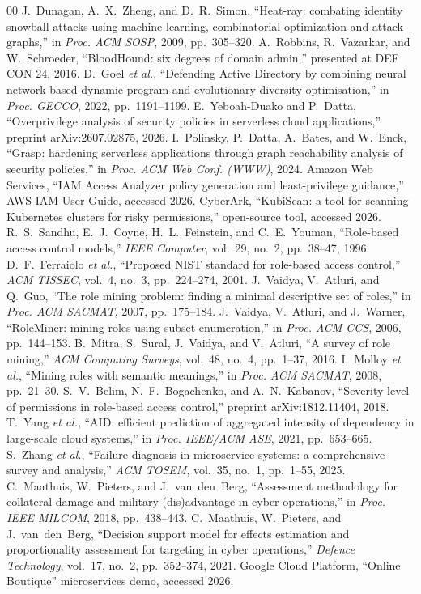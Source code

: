 \documentclass[conference]{IEEEtran}
\begin{document}
\begin{thebibliography}{00}
 J.~Dunagan, A.~X.~Zheng, and D.~R.~Simon, ``Heat-ray: combating
identity snowball attacks using machine learning, combinatorial optimization and
attack graphs,'' in \emph{Proc. ACM SOSP}, 2009, pp.~305--320.
 A.~Robbins, R.~Vazarkar, and W.~Schroeder, ``BloodHound: six
degrees of domain admin,'' presented at DEF CON 24, 2016.
 D.~Goel \emph{et al.}, ``Defending Active Directory by combining
neural network based dynamic program and evolutionary diversity optimisation,'' in
\emph{Proc. GECCO}, 2022, pp.~1191--1199.
 E.~Yeboah-Duako and P.~Datta, ``Overprivilege analysis of
security policies in serverless cloud applications,'' preprint arXiv:2607.02875,
2026.
 I.~Polinsky, P.~Datta, A.~Bates, and W.~Enck, ``Grasp: hardening
serverless applications through graph reachability analysis of security policies,''
in \emph{Proc. ACM Web Conf. (WWW)}, 2024.
 Amazon Web Services, ``IAM Access Analyzer policy generation and
least-privilege guidance,'' AWS IAM User Guide, accessed 2026.
 CyberArk, ``KubiScan: a tool for scanning Kubernetes clusters for
risky permissions,'' open-source tool, accessed 2026.
 R.~S.~Sandhu, E.~J.~Coyne, H.~L.~Feinstein, and C.~E.~Youman,
``Role-based access control models,'' \emph{IEEE Computer}, vol.~29, no.~2,
pp.~38--47, 1996.
 D.~F.~Ferraiolo \emph{et al.}, ``Proposed NIST standard for
role-based access control,'' \emph{ACM TISSEC}, vol.~4, no.~3, pp.~224--274, 2001.
 J.~Vaidya, V.~Atluri, and Q.~Guo, ``The role mining problem: finding a
minimal descriptive set of roles,'' in \emph{Proc. ACM SACMAT}, 2007, pp.~175--184.
 J.~Vaidya, V.~Atluri, and J.~Warner, ``RoleMiner: mining roles
using subset enumeration,'' in \emph{Proc. ACM CCS}, 2006, pp.~144--153.
 B.~Mitra, S.~Sural, J.~Vaidya, and V.~Atluri, ``A survey of
role mining,'' \emph{ACM Computing Surveys}, vol.~48, no.~4, pp.~1--37, 2016.
 I.~Molloy \emph{et al.}, ``Mining roles with semantic meanings,''
in \emph{Proc. ACM SACMAT}, 2008, pp.~21--30.
 S.~V.~Belim, N.~F.~Bogachenko, and A.~N.~Kabanov, ``Severity level
of permissions in role-based access control,'' preprint arXiv:1812.11404, 2018.
 T.~Yang \emph{et al.}, ``AID: efficient prediction of aggregated
intensity of dependency in large-scale cloud systems,'' in \emph{Proc. IEEE/ACM
ASE}, 2021, pp.~653--665.
 S.~Zhang \emph{et al.}, ``Failure diagnosis in microservice
systems: a comprehensive survey and analysis,'' \emph{ACM TOSEM}, vol.~35, no.~1,
pp.~1--55, 2025.
 C.~Maathuis, W.~Pieters, and J.~van~den~Berg, ``Assessment
methodology for collateral damage and military (dis)advantage in cyber operations,'' in
\emph{Proc. IEEE MILCOM}, 2018, pp.~438--443.
 C.~Maathuis, W.~Pieters, and J.~van~den~Berg, ``Decision support
model for effects estimation and proportionality assessment for targeting in cyber
operations,'' \emph{Defence Technology}, vol.~17, no.~2, pp.~352--374, 2021.
 Google Cloud Platform, ``Online Boutique'' microservices demo, accessed 2026.
\end{thebibliography}
\end{document}
